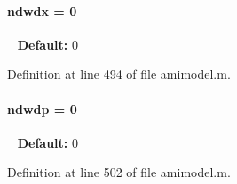 \hypertarget{classamimodel_ae6c1afb5529f1cc0ff56552f94e7a2b5}{}
\paragraph[{ndwdx}]{\setlength{\rightskip}{0pt plus 5cm}ndwdx = 0}\label{classamimodel_ae6c1afb5529f1cc0ff56552f94e7a2b5}
~\newline
{\bfseries Default\+:} 0 

Definition at line 494 of file amimodel.\+m.

\hypertarget{classamimodel_aa8af9048cd0280059bed9ef8999ecffb}{}
\paragraph[{ndwdp}]{\setlength{\rightskip}{0pt plus 5cm}ndwdp = 0}\label{classamimodel_aa8af9048cd0280059bed9ef8999ecffb}
~\newline
{\bfseries Default\+:} 0 

Definition at line 502 of file amimodel.\+m.

